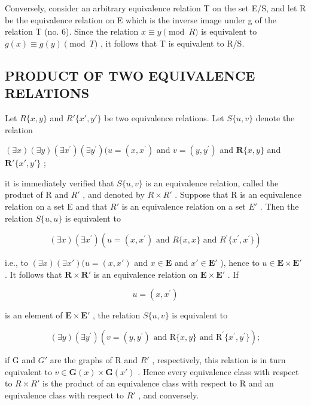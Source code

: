 Conversely, consider an arbitrary equivalence relation T on the set E/S, and let R be the equivalence relation on E which is the inverse image under g of the relation T (no. 6). Since the relation \(x \equiv y \pmod{R}\) is equivalent to \(g(x) \equiv g(y) \pmod{T}\) , it follows that T is equivalent to R/S.

\subsection{PRODUCT OF TWO EQUIVALENCE RELATIONS}

Let \(R\{x, y\}\) and \(R'\{x', y'\}\) be two equivalence relations. Let \(S\{u, v\}\) denote the relation

\((\exists x)(\exists y)(\exists x^{\prime})(\exists y^{\prime})(u = (x,x^{\prime})\) and \(v = (y,y^{\prime})\) and \(\mathbf{R}\{x,y\}\) and \(\mathbf{R}'\{x',y'\}\) ;

it is immediately verified that \(S\{u, v\}\) is an equivalence relation, called the product of R and \(R'\) , and denoted by \(R \times R'\) . Suppose that R is an equivalence relation on a set E and that \(R'\) is an equivalence relation on a set \(E'\) . Then the relation \(S\{u, u\}\) is equivalent to

\[
(\exists x) (\exists x ^ {\prime}) (u = (x, x ^ {\prime}) \text { and } R \{x, x \} \text { and } R ^ {\prime} \{x ^ {\prime}, x ^ {\prime} \})
\]

i.e., to \((\exists x)(\exists x')(u = (x, x')\) and \(x \in \mathbf{E}\) and \(x' \in \mathbf{E}'\) ), hence to \(u \in \mathbf{E} \times \mathbf{E}'\) . It follows that \(\mathbf{R} \times \mathbf{R}'\) is an equivalence relation on \(\mathbf{E} \times \mathbf{E}'\) . If

\[
u = (x, x ^ {\prime})
\]

is an element of \(\mathbf{E} \times \mathbf{E}'\) , the relation \(S\{u, v\}\) is equivalent to

\[
(\exists y) (\exists y ^ {\prime}) (v = (y, y ^ {\prime}) \text {   and   } \mathrm{R} \{x, y \} \text {   and   } \mathrm{R} ^ {\prime} \{x ^ {\prime}, y ^ {\prime} \});
\]

if G and \(G'\) are the graphs of R and \(R'\) , respectively, this relation is in turn equivalent to \(v \in \mathbf{G}(x) \times \mathbf{G}(x')\) . Hence every equivalence class with respect to \(R \times R'\) is the product of an equivalence class with respect to R and an equivalence class with respect to \(R'\) , and conversely.

